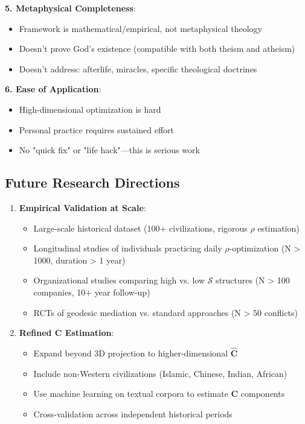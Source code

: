 \documentclass[11pt,a4paper]{article}
\theoremstyle{definition}
\theoremstyle{remark}
\begin{document}
\begin{enumerate}
\begin{mdframed}[backgroundcolor=yellow!10,linewidth=2pt]
\textbf{5. Metaphysical Completeness}:
\begin{itemize}
    \item Framework is mathematical/empirical, not metaphysical theology
    \item Doesn't prove God's existence (compatible with both theism and atheism)
    \item Doesn't address: afterlife, miracles, specific theological doctrines
\end{itemize}

\textbf{6. Ease of Application}:
\begin{itemize}
    \item High-dimensional optimization is hard
    \item Personal practice requires sustained effort
    \item No "quick fix" or "life hack"—this is serious work
\end{itemize}
\end{mdframed}

\subsection{Future Research Directions}

\begin{enumerate}[leftmargin=*]
\item \textbf{Empirical Validation at Scale}:
    \begin{itemize}
        \item Large-scale historical dataset (100+ civilizations, rigorous \(\rho\) estimation)
        \item Longitudinal studies of individuals practicing daily \(\rho\)-optimization (N > 1000, duration > 1 year)
        \item Organizational studies comparing high vs. low \(\mathcal{S}\) structures (N > 100 companies, 10+ year follow-up)
        \item RCTs of geodesic mediation vs. standard approaches (N > 50 conflicts)
    \end{itemize}

\item \textbf{Refined \(\mathbf{C}\) Estimation}:
    \begin{itemize}
        \item Expand beyond 3D projection to higher-dimensional \(\hat{\mathbf{C}}\)
        \item Include non-Western civilizations (Islamic, Chinese, Indian, African)
        \item Use machine learning on textual corpora to estimate \(\mathbf{C}\) components
        \item Cross-validation across independent historical periods
    \end{itemize}


\end{enumerate}
\end{enumerate}
\end{document}
